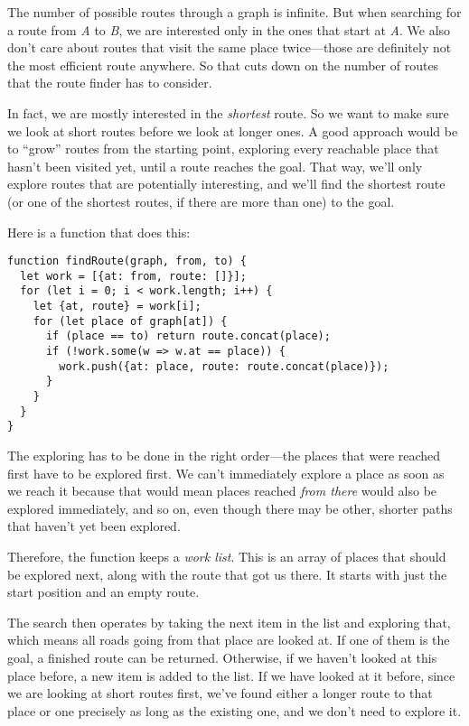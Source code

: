The  number of possible routes through a graph is infinite. But when searching for a route from \emph{A} to \emph{B}, we are interested only in the ones that start at \emph{A}. We also don't care about routes that visit the same place twice—those are definitely not the most efficient route anywhere. So that cuts down on the number of routes that the route finder has to consider.

In fact, we are mostly interested in the \emph{shortest} route. So we want to make sure we look at short routes before we look at longer ones. A good approach would be to ``grow'' routes from the starting point, exploring every reachable place that hasn't been visited yet, until a route reaches the goal. That way, we'll only explore routes that are potentially interesting, and we'll find the shortest route (or one of the shortest routes, if there are more than one) to the goal.

\label{robot.findRoute}Here is a function that does this:

\begin{lstlisting}
function findRoute(graph, from, to) {
  let work = [{at: from, route: []}];
  for (let i = 0; i < work.length; i++) {
    let {at, route} = work[i];
    for (let place of graph[at]) {
      if (place == to) return route.concat(place);
      if (!work.some(w => w.at == place)) {
        work.push({at: place, route: route.concat(place)});
      }
    }
  }
}
\end{lstlisting}
\noindent

The exploring has to be done in the right order—the places that were reached first have to be explored first. We can't immediately explore a place as soon as we reach it because that would mean places reached \emph{from there} would also be explored immediately, and so on, even though there may be other, shorter paths that haven't yet been explored.

Therefore, the function keeps a \emph{work list}. This is an array of places that should be explored next, along with the route that got us there. It starts with just the start position and an empty route.

The search then operates by taking the next item in the list and exploring that, which means all roads going from that place are looked at. If one of them is the goal, a finished route can be returned. Otherwise, if we haven't looked at this place before, a new item is added to the list. If we have looked at it before, since we are looking at short routes first, we've found either a longer route to that place or one precisely as long as the existing one, and we don't need to explore it.

